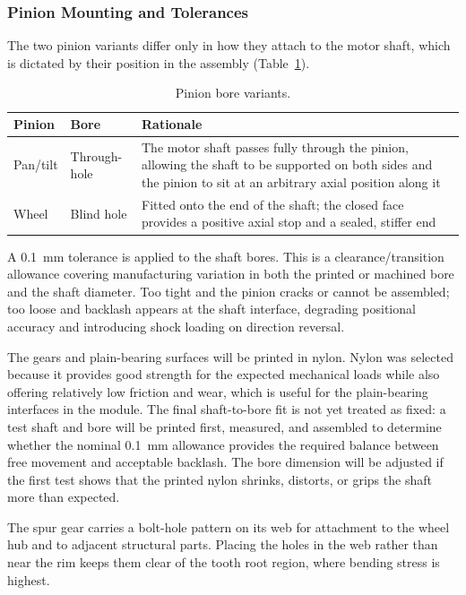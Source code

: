 \documentclass[12pt,a4paper]{article}
\begin{document}
\subsubsection{Pinion Mounting and Tolerances}

The two pinion variants differ only in how they attach to the motor shaft,
which is dictated by their position in the assembly
(Table~\ref{tab:pinion-mount}).

\begin{table}[htbp]
	\centering
	\caption{Pinion bore variants.}
	\label{tab:pinion-mount}
	\begin{tabular}{llp{6.2cm}}
		\toprule
		\textbf{Pinion} & \textbf{Bore} & \textbf{Rationale} \\
		\midrule
		Pan/tilt & Through-hole &
		The motor shaft passes fully through the pinion, allowing the shaft to be
		supported on both sides and the pinion to sit at an arbitrary axial
		position along it \\
		\addlinespace
		Wheel & Blind hole &
		Fitted onto the end of the shaft; the closed face provides a positive
		axial stop and a sealed, stiffer end \\
		\bottomrule
	\end{tabular}
\end{table}

A \SI{0.1}{\milli\metre} tolerance is applied to the shaft bores. This is a
clearance/transition allowance covering manufacturing variation in both the
printed or machined bore and the shaft diameter. Too tight and the pinion cracks
or cannot be assembled; too loose and backlash appears at the shaft interface,
degrading positional accuracy and introducing shock loading on direction
reversal.

The gears and plain-bearing surfaces will be printed in nylon. Nylon was
selected because it provides good strength for the expected mechanical loads
while also offering relatively low friction and wear, which is useful for the
plain-bearing interfaces in the module. The final shaft-to-bore fit is not yet
treated as fixed: a test shaft and bore will be printed first, measured, and
assembled to determine whether the nominal \SI{0.1}{\milli\metre} allowance
provides the required balance between free movement and acceptable backlash.
The bore dimension will be adjusted if the first test shows that the printed
nylon shrinks, distorts, or grips the shaft more than expected.

The spur gear carries a bolt-hole pattern on its web for attachment to the wheel
hub and to adjacent structural parts. Placing the holes in the web rather than
near the rim keeps them clear of the tooth root region, where bending stress is
highest.
\end{document}
